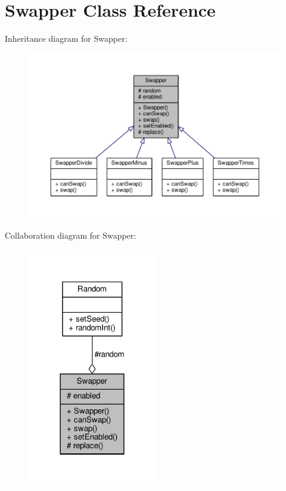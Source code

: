 \hypertarget{classSwapper}{}\section{Swapper Class Reference}
\label{classSwapper}


Inheritance diagram for Swapper\+:
\nopagebreak
\begin{figure}[H]
\begin{center}
\leavevmode
\includegraphics[width=350pt]{classSwapper__inherit__graph}
\end{center}
\end{figure}


Collaboration diagram for Swapper\+:
\nopagebreak
\begin{figure}[H]
\begin{center}
\leavevmode
\includegraphics[width=161pt]{classSwapper__coll__graph}
\end{center}
\end{figure}
